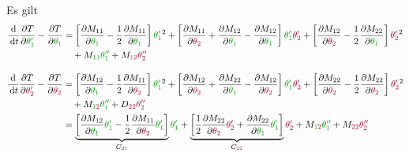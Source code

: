 \documentclass[a4paper, 12pt]{scrartcl}
\newcommand{\gruen}[2][gruen]{\textcolor{#1}{#2}}
\newcommand{\dunkelrot}[2][dunkelrot]{\textcolor{#1}{#2}}
\newcommand{\dt}{\thinspace \mathrm{d}t}
\begin{document}
Es gilt 
\begin{align*}
    \frac{\mathrm{d}}{\dt} \frac{\partial T}{\partial \gruen{\theta_{1}'}}  - \frac{\partial T}{\partial \gruen{\theta_{1}}}
    &=
    \left[ \frac{\partial M_{11}}{\partial \gruen{\theta_{1}}} - \frac{1}{2}  \frac{\partial M_{11}}{\partial \gruen{\theta_{1}}} \right] \gruen{\theta_{1}'}^2
    + \left[ \frac{\partial M_{11}}{\partial \dunkelrot{\theta_{2}}} + \frac{\partial M_{12}}{\partial \gruen{\theta_{1}}} -  \frac{\partial M_{12}}{\partial \gruen{\theta_{1}}} \right] \gruen{\theta_{1}'} \dunkelrot{ \theta_{2}'} 
    + \left[\frac{\partial M_{12}}{\partial \dunkelrot{\theta_{2}}} - \frac{1}{2} \frac{\partial M_{22}}{\partial \gruen{\theta_{1}}} \right] \dunkelrot{\theta_{2}'}^2 \\
    & \quad
    +  M_{\gruen{1 1}} \gruen{\theta_{1}''} 
    + M_{\gruen{1}\dunkelrot{2}} \dunkelrot{\theta_{2}''}
\end{align*}

\begin{align*}
\frac{\mathrm{d}}{\dt} \frac{\partial T}{\partial \dunkelrot{\theta_{2}'}} - \frac{\partial T}{\partial \dunkelrot{\theta_{2}}}
&= 
\left[ \frac{\partial M_{12}}{\partial \gruen{\theta_{1}}} - \frac{1}{2} \frac{\partial M_{11}}{\partial \dunkelrot{\theta_{2}}} \right] \gruen{\theta_{1}'}^2 
+ \left[ \frac{\partial M_{12}}{\partial \dunkelrot{\theta_{2}}} + \frac{\partial M_{22}}{\partial \gruen{\theta_{1}}} - \frac{\partial M_{12}}{\partial \dunkelrot{\theta_{2}}} \right] \gruen{\theta_{1}'} \dunkelrot{\theta_{2}'} 
+ \left[ \frac{\partial M_{22}}{\partial \dunkelrot{\theta_{2}}} - \frac{1}{2} \frac{\partial M_{22}}{\partial \dunkelrot{\theta_{2}}} \right]  \dunkelrot{\theta_{2}'}^2 \\
& \quad + M_{\gruen{1}\dunkelrot{2}} \gruen{\theta_{1}''} + D_{\dunkelrot{22}} \dunkelrot{\theta_{2}''} \\
&=
\underbrace{\left[ \frac{\partial M_{12}}{\partial \gruen{\theta_{1}}} \gruen{\theta_{1}'} - \frac{1}{2} \frac{\partial M_{11}}{\partial \dunkelrot{\theta_{2}}} \gruen{\theta_{1}'} \right]}_{C_{\dunkelrot{2}\gruen{1}}} \gruen{\theta_{1}'}
+ \underbrace{\left[ \frac{1}{2} \frac{\partial M_{22}}{\partial \dunkelrot{\theta_{2}}}  \dunkelrot{\theta_{2}'} + \frac{\partial M_{22}}{\partial \gruen{\theta_{1}}} \gruen{\theta_{1}'} \right]}_{C_{\dunkelrot{22}}}  \dunkelrot{\theta_{2}'}
+ M_{\gruen{1}\dunkelrot{2}} \gruen{\theta_{1}''} + M_{\dunkelrot{22}} \dunkelrot{\theta_{2}''}
\end{align*}
\end{document}
